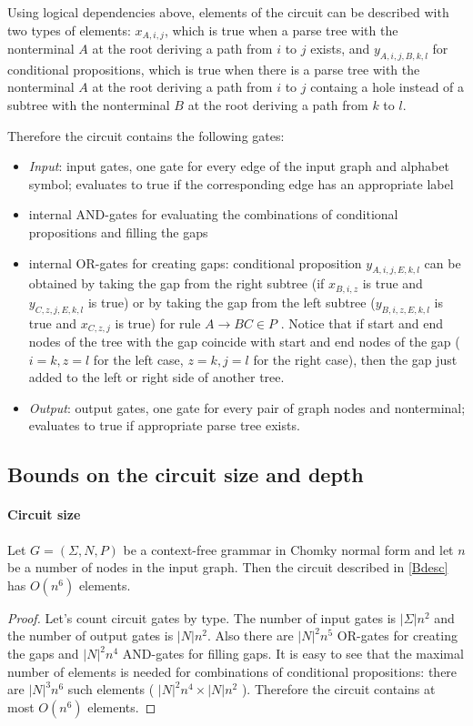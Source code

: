 Using logical dependencies above, elements of the circuit can be described with two types of elements: $x_{A, i,  j}$, which is true when a parse tree with the nonterminal $A$ at the root deriving a path from $i$ to $j$ exists, and $y_{A, i,  j, B, k, l}$ for conditional propositions, which is true when there is a parse tree with the nonterminal $A$ at the root deriving a path from $i$ to $j$ containg a hole instead of a subtree with the nonterminal $B$ at the root deriving a path from $k$ to $l$.


Therefore the circuit contains the following gates:
\begin{itemize}
\item \textit{Input}: input gates, one gate for every edge of the input graph and alphabet symbol; evaluates to true if the corresponding edge has an appropriate label
\item internal AND-gates for evaluating the combinations of conditional propositions and filling the gaps
\item internal OR-gates for creating gaps: conditional proposition $y_{A, i,  j, E, k, l}$ can be obtained by taking the gap from the right subtree (if $x_{B, i,  z}$ is true and $y_{C, z,  j, E, k, l}$ is true) or by taking the gap from the left subtree ($y_{B, i,  z, E, k, l}$ is true and $x_{C, z,  j}$ is true) for rule $A \rightarrow BC \in P$ . Notice that if start and end nodes of the tree with the gap coincide with start and end nodes of the gap ($i = k, z = l$ for the left case, $z = k, j = l$ for the right case), then the gap just added to the left or right side of another tree.
\item  \textit{Output}: output gates, one gate for every pair of graph nodes and nonterminal; evaluates to true if appropriate parse tree exists.
\end{itemize}

\subsection{Bounds on the circuit size and depth}
\paragraph{Circuit size}
\begin{lemma}
Let $G = (\Sigma, N, P)$ be a context-free grammar in Chomky normal form and let $n$ be a number of nodes in the input graph. Then the circuit described in \ref{Bdesc} has $O(n^6)$ elements.
\end{lemma}
\begin{proof} Let's count circuit gates by type. The number of input gates is $|\Sigma|n^2$ and the number of output gates is $|N|n^2$. Also there are $|N|^2n^5$ OR-gates for creating the gaps and $|N|^2n^4$ AND-gates for filling gaps. It is easy to see that the maximal number of elements is needed for combinations of conditional propositions: there are $|N|^3n^6$ such elements ( $|N|^2n^4 \times |N|n^2$ ). Therefore the circuit contains at most $O(n^6)$ elements.
\end{proof}
